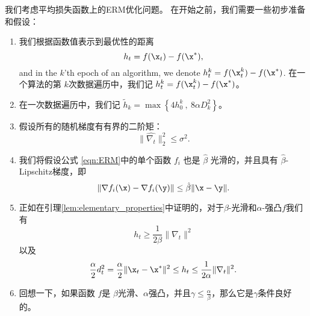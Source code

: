 我们考虑平均损失函数上的ERM优化问题。
在开始之前，我们需要一些初步准备和假设：
\begin{enumerate}
\item
我们根据函数值表示到最优性的距离
$$ h_t = f(\x_t) - f(\x^*) , $$
and in the $k$'th epoch of an algorithm, we denote $h_t^k =  f(\x_t^k) - f(\x^*)$. 
在一个算法的第 $k$次数据遍历中，我们记 $h_t^k =  f(\x_t^k) - f(\x^*)$。


\item
在一次数据遍历中，我们记 $\tilde{h}_k = \max \left\{ 4 h_0^k \ , \  8 \alpha D_k^2 \right\} $。

\item
假设所有的随机梯度有有界的二阶矩：
$$\| \hat{\nabla_t}\|_2^2 \leq \sigma^2 . $$

\item
我们将假设公式 \eqref{eqn:ERM}中的单个函数 $f_i$ 也是 $\hat{\beta}$ 光滑的，并且具有 $\hat{\beta}$-Lipschitz梯度，即
$$ \|  {\nabla} f_i(\x) -  {\nabla} f_i(\y)  \| \leq \hat{\beta} \| \x-\y \| . $$

\item
正如在引理\ref{lem:elementary_properties}中证明的，对于$\beta$-光滑和$\alpha$-强凸$f$我们有
$$ h_t \geq \frac{1}{2 \beta} \| \nabla_t \|^2 $$ 
以及
$$\frac{\alpha}{2} d_t^2 =  \frac{ \alpha}{2} \| \x_t - \x^*\|^2  \leq h_t \leq  \frac{1}{2 \alpha} \|\nabla_t\|^2 .   $$



\item
回想一下，如果函数 $f$是 $\beta$光滑、$\alpha$强凸，并且$\gamma \leq \frac{\alpha}{\beta}$，那么它是$\gamma$条件良好的。

\end{enumerate}




